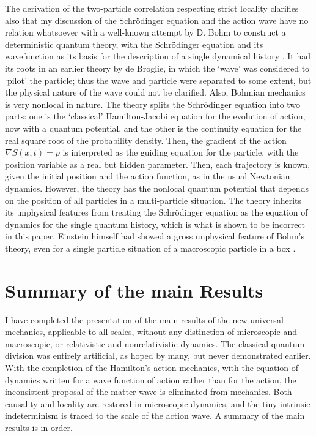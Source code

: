 The derivation of the two-particle correlation respecting strict locality clarifies also that
my discussion of the Schrödinger equation and the action wave have no relation whatsoever
with a well-known attempt by D. Bohm to construct a deterministic quantum theory, with
the Schrödinger equation and its wavefunction as its basis for the description of a single
dynamical history \cite{chap14-key10}. It had its roots in an earlier theory by de Broglie, in which the
‘wave' was considered to `pilot' the particle; thus the wave and particle were separated to
some extent, but the physical nature of the wave could not be clarified. Also, Bohmian
mechanics is very nonlocal in nature. The theory splits the Schr\"{o}dinger equation into two
parts: one is the `classical' Hamilton-Jacobi equation for the evolution of action, now with
a quantum potential, and the other is the continuity equation for the real square root of
the probability density. Then, the gradient of the action $\nabla S(x, t) = p$ is interpreted as the
guiding equation for the particle, with the position variable as a real but hidden parameter.
Then, each trajectory is known, given the initial position and the action function, as in the
usual Newtonian dynamics. However, the theory has the nonlocal quantum potential that
depends on the position of all particles in a multi-particle situation. The theory inherits its
unphysical features from treating the Schr\"{o}dinger equation as the equation of dynamics for
the single quantum history, which is what is shown to be incorrect in this paper. Einstein
himself had showed a gross unphysical feature of Bohm's theory, even for a single particle
situation of a macroscopic particle in a box \cite{chap14-key11}.

\section{Summary of the main Results}\label{c14-sec8}

I have completed the presentation of the main results of the new universal mechanics,
applicable to all scales, without any distinction of microscopic and macroscopic, or relativistic and nonrelativistic dynamics. The classical-quantum division was entirely artificial, as hoped by many, but never demonstrated earlier. With the completion of the Hamilton's action mechanics, with the equation of dynamics written for a wave function of action rather than for the action, the inconsistent proposal of the matter-wave is eliminated from mechanics. Both causality and locality are restored in microscopic dynamics, and the tiny intrinsic indeterminism is traced to the scale of the action wave. A summary of the main results is in order.
\newpage

